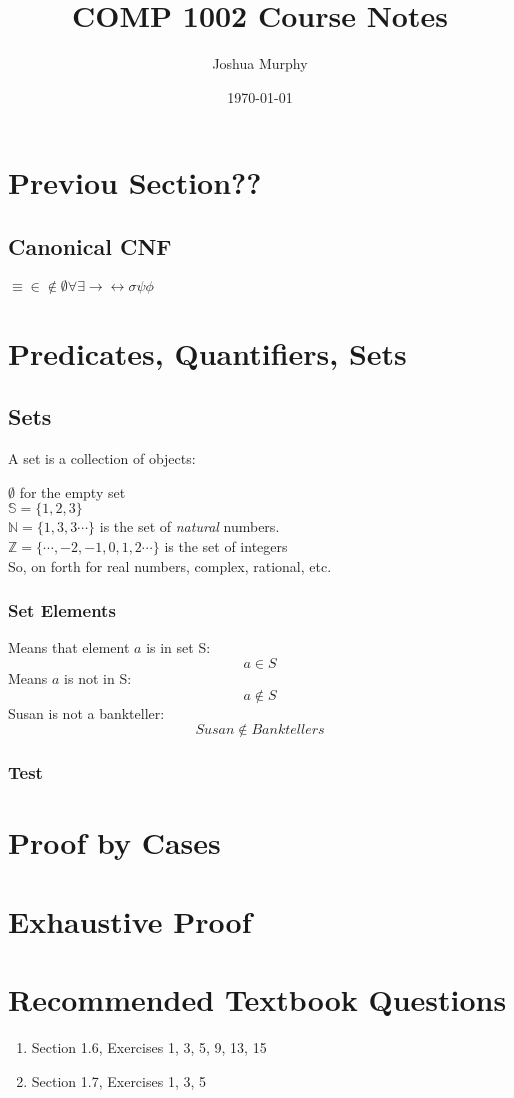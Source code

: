 \documentclass[titlepage]{article}
\title{COMP 1002 Course Notes}
\author{Joshua Murphy}
\date{\today}
\begin{document}
\maketitle
\tableofcontents{}
\pagebreak

\section{Previou Section??}
\subsection{Canonical CNF}

$\equiv \in \notin \emptyset \forall \exists \rightarrow \leftrightarrow \sigma
\psi \phi $
\section{Predicates, Quantifiers, Sets}

\subsection{Sets}

A set is a collection of objects:

$ \emptyset $ for the empty set \\
$ \mathbb{S} = \{1, 2, 3\}$ \\ 
$ \mathbb{N} = \{ 1,3,3\cdots\}$  is the set of \textit{natural} numbers. \\
$ \mathbb{Z} = \{\cdots, -2, -1, 0, 1, 2 \cdots\} $ is the set of integers \\

So, on forth  for real numbers, complex, rational, etc.

\subsubsection{Set Elements}

Means that element $a$ is in set S: 
\begin{equation}
 a \in S 
\end{equation}
Means $a$ is not in S:
\begin{equation}
 a \notin S
\end{equation}
Susan is not a bankteller: 
\begin{equation}
 Susan \notin Banktellers 
\end{equation}

\subsubsection{Test}

\section{Proof by Cases}
\section{Exhaustive Proof}

\section{Recommended Textbook Questions}
\begin{enumerate}
    \item Section 1.6, Exercises 1, 3, 5, 9, 13, 15
    \item Section 1.7, Exercises 1, 3, 5
\end{enumerate}
\end{document}
